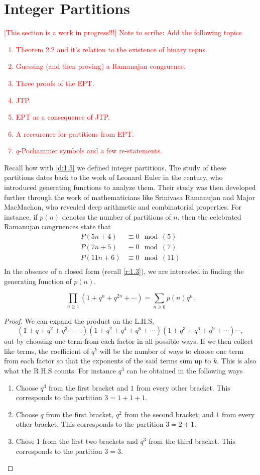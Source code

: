 \section{Integer Partitions}
\textcolor{red}{
[This section is a work in progress!!!] Note to scribe: Add the following topics
\begin{enumerate}
    \item Theorem 2.2 and it's relation to the existence of binary repns.
    \item Guessing (and then proving) a Ramanujan congruence.
    \item Three proofs of the EPT.
    \item JTP. 
    \item EPT as a consequence of JTP.
    \item A reccurence for partitions from EPT. 
    \item $q$-Pochammer symbols and a few  re-statements. 
\end{enumerate}
}
Recall how with \cref{d:1.5} we defined integer partitions. The study of these partitions dates back to the work of Leonard Euler in the  century, who introduced generating functions to analyze them. Their study was then developed further through the work of mathematicians like Srinivasa Ramanujan and Major MacMachon, who revealed deep arithmetic and combinatorial properties. For instance, if $p(n)$ denotes the number of partitions of $n$, then the celebrated Ramanujan congruences state that
\begin{align*}
P(5n+4)&\equiv 0\mod{(5)} \\
P(7n+5)&\equiv 0\mod{(7)} \\
P(11n+6)&\equiv 0\mod{(11)} \\ 
\end{align*}
In the absence of a closed form (recall \cref{r:1.3}), we are interested in finding the generating function of $p(n)$.
\begin{claim}\[
\prod_{n\geq 1}(1+q^n+q^{2n}+\cdots) = \sum_{n\geq 0}p(n)q^n.
\]
\label{c:2.1P}
\end{claim}
\begin{proof}
We can expand the product on the L.H.S, \[(1+q+q^2+q^3+\cdots)(1+q^2+q^4+q^6+\cdots)(1+q^3+q^6+q^9+\cdots)\cdots,\] out by choosing one term from each factor in all possible ways. If we then collect like terms, the coefficient of $q^k$ will be the number of ways to choose one term from each factor so that the exponents of the said terms sum up to $k$. This is also what the R.H.S counts. For instance $q^3$ can be obtained in the following ways
\begin{enumerate}
    \item Choose $q^3$ from the first bracket and $1$ from every other bracket. This corresponds to the partition $3=1+1+1$.
    \item Choose $q$ from the first bracket, $q^2$ from the second bracket, and $1$ from every other bracket. This corresponds to the partition $3=2+1$. 
    \item Chose $1$ from the first two brackets and $q^3$ from the third bracket. This corresponds to the partition $3=3$. 
\end{enumerate}
\end{proof}
